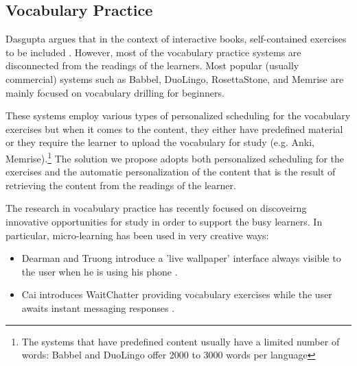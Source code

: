 \subsection{Vocabulary Practice}


Dasgupta argues that in the context of interactive books, self-contained exercises to be included \cite{Dasgupta10-Play}. However, most of the vocabulary practice systems are disconnected from the readings of the learners. Most popular (usually commercial) systems such as Babbel, DuoLingo, RosettaStone, and Memrise are mainly focused on vocabulary drilling for beginners. 

These systems employ various types of personalized scheduling for the vocabulary exercises but when it comes to the content, they either have predefined material or they require the learner to upload the vocabulary for study (e.g. Anki, Memrise).\footnote{The systems that have predefined content usually have a limited number of words: Babbel and DuoLingo offer 2000 to 3000 words per language} 
The solution we propose adopts both personalized scheduling for the exercises and the automatic personalization of the content that is the result of retrieving the content from the readings of the learner.









The research in vocabulary practice has recently focused on discoveirng innovative opportunities for study in order to support the busy learners. In particular, micro-learning has been used in very creative ways: 

\begin{itemize}

	\item Dearman and Truong introduce a 'live wallpaper' interface always visible to the user when he is using his phone \cite{Dear12-ImplicitAcquisition}. 

	\item Cai introduces WaitChatter providing vocabulary exercises while the user awaits instant messaging responses \cite{Cai15-wait}.

\end{itemize}


